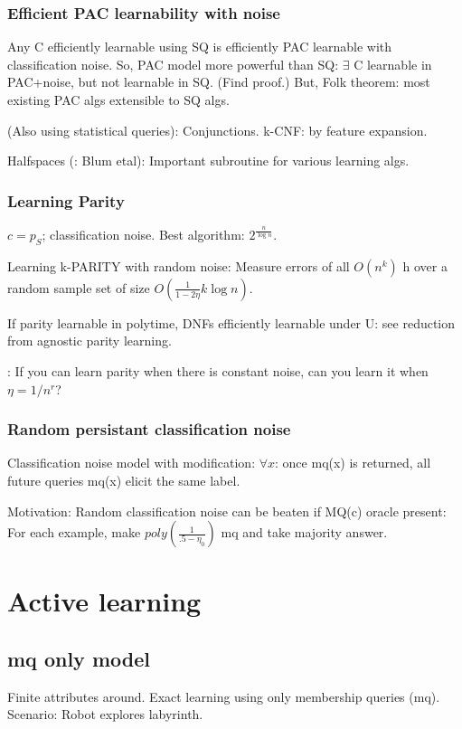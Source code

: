 \documentclass[oneside, article]{memoir}
\begin{document}
\subsection{Efficient PAC learnability with noise}
Any C efficiently learnable using SQ is efficiently PAC learnable with classification noise. So, PAC model more powerful than SQ: $\exists$ C learnable in PAC+noise, but not learnable in SQ. (Find proof.) But, Folk theorem: most existing PAC algs extensible to SQ algs.

(Also using statistical queries): Conjunctions. k-CNF: by feature expansion.

Halfspaces (\why: Blum etal): Important subroutine for various learning algs.

\subsection{Learning Parity}
$c = p_{S}$; classification noise. Best algorithm: $2^{\frac{n}{\log n}}$. \why

Learning k-PARITY with random noise: Measure errors of all $O(n^k)$ h over a random sample set of size $O(\frac{1}{1-2\eta} k \log n)$.

If parity learnable in polytime, DNFs efficiently learnable under U: see reduction from agnostic parity learning.

\oprob: If you can learn parity when there is constant noise, can you learn it when $\eta = 1/n^{r}$?

\subsection{Random persistant classification noise}
Classification noise model with modification: $\forall x$: once mq(x) is returned, all future queries mq(x) elicit the same label.

Motivation: Random classification noise can be beaten if MQ(c) oracle present: For each example, make $poly(\frac{1}{.5-\eta_{0}})$ mq and take majority answer.

\chapter{Active learning}
\section{mq only model}
Finite attributes around. Exact learning using only membership queries (mq). Scenario: Robot explores labyrinth.
\end{document}
